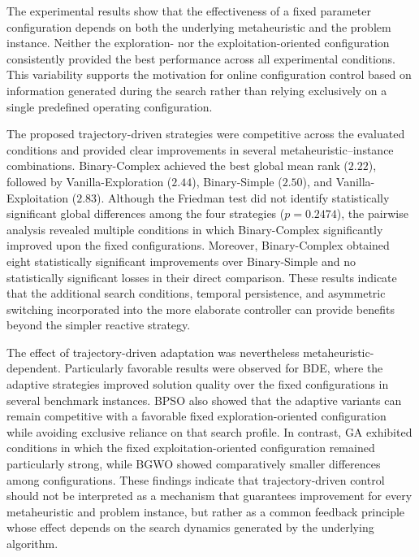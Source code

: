 \documentclass[journal,article,submit,moreauthors]{Definitions/mdpi}
\begin{document}
The experimental results show that the effectiveness of a fixed parameter
configuration depends on both the underlying metaheuristic and the problem
instance. Neither the exploration- nor the exploitation-oriented
configuration consistently provided the best performance across all
experimental conditions. This variability supports the motivation for
online configuration control based on information generated during the
search rather than relying exclusively on a single predefined operating
configuration.

The proposed trajectory-driven strategies were competitive across the
evaluated conditions and provided clear improvements in several
metaheuristic--instance combinations. Binary-Complex achieved the best
global mean rank ($2.22$), followed by Vanilla-Exploration ($2.44$),
Binary-Simple ($2.50$), and Vanilla-Exploitation ($2.83$). Although the
Friedman test did not identify statistically significant global differences
among the four strategies ($p=0.2474$), the pairwise analysis revealed
multiple conditions in which Binary-Complex significantly improved upon
the fixed configurations. Moreover, Binary-Complex obtained eight
statistically significant improvements over Binary-Simple and no
statistically significant losses in their direct comparison. These results
indicate that the additional search conditions, temporal persistence, and
asymmetric switching incorporated into the more elaborate controller can
provide benefits beyond the simpler reactive strategy.

The effect of trajectory-driven adaptation was nevertheless
metaheuristic-dependent. Particularly favorable results were observed for
BDE, where the adaptive strategies improved solution quality over the fixed
configurations in several benchmark instances. BPSO also showed that the
adaptive variants can remain competitive with a favorable fixed
exploration-oriented configuration while avoiding exclusive reliance on
that search profile. In contrast, GA exhibited conditions in which the
fixed exploitation-oriented configuration remained particularly strong,
while BGWO showed comparatively smaller differences among configurations.
These findings indicate that trajectory-driven control should not be
interpreted as a mechanism that guarantees improvement for every
metaheuristic and problem instance, but rather as a common feedback
principle whose effect depends on the search dynamics generated by the
underlying algorithm.
\end{document}
